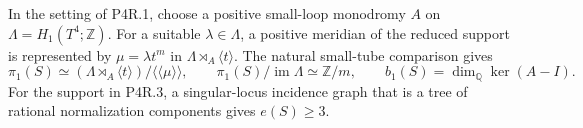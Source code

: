 
\begin{proposition}[P4R.4]\hypertarget{tag-02YG}{}\label{night:P4R.4}\label{stmt:P4R.4}


In the setting of P4R.1, choose a positive small-loop
monodromy $A$ on $\Lambda=H_1(T^4;\mathbb Z)$.
For a suitable $\lambda\in\Lambda$, a positive
meridian of the reduced support is represented by
$\mu=\lambda t^m$ in $\Lambda\rtimes_A\langle t\rangle$.
The natural small-tube comparison gives
\[
 \pi_1(S)\simeq
 (\Lambda\rtimes_A\langle t\rangle)/\langle\!\langle\mu\rangle\!\rangle,
 \qquad
 \pi_1(S)/\operatorname{im}\Lambda\simeq\mathbb Z/m,
 \qquad
 b_1(S)=\dim_{\mathbb Q}\ker(A-I).
\]
For the support in P4R.3, a singular-locus incidence
graph that is a tree of rational normalization
components gives $e(S)\ge3$.
\end{proposition}

